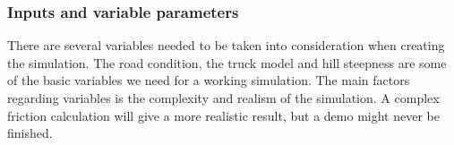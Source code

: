 \documentclass[a4,10pt]{article}
\begin{document}
\subsubsection{Inputs and variable parameters}
There are several variables needed to be taken into consideration when creating the simulation. The road condition, the truck model and hill steepness are some of the basic variables we need for a working simulation. The main factors regarding variables is the complexity and realism of the simulation. A complex friction calculation will give a more realistic result, but a demo might never be finished. 



\pagebreak


\end{document}
